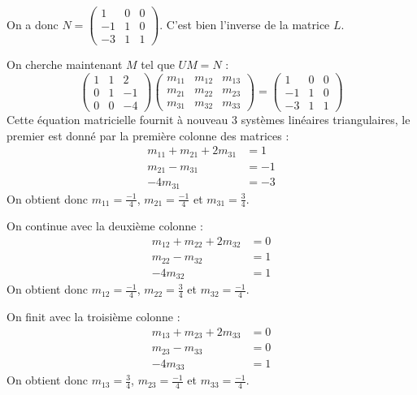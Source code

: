 \documentclass[10pt]{article}
\newenvironment{solution}
    {\par\vspace{0.5em}\begin{mdframed}[linewidth=0.5pt]\par}
    {\end{mdframed}\par\vspace{0.5em}}
\begin{document}
\begin{enumerate}
{\begin{solution}
            On a donc $N = \begin{pmatrix} 1 & 0 & 0 \\ -1 & 1 & 0 \\ -3 & 1 & 1 \end{pmatrix}$. C'est bien l'inverse de la matrice $L$. 

            On cherche maintenant $M$ tel que $U M = N$ : 
            \[
                \begin{pmatrix}
                    1 & 1 & 2 \\
                    0 & 1 & -1 \\
                    0 & 0 & -4
                \end{pmatrix}
                \begin{pmatrix}
                    m_{11} & m_{12} & m_{13} \\
                    m_{21} & m_{22} & m_{23} \\
                    m_{31} & m_{32} & m_{33}
                \end{pmatrix}
                = \begin{pmatrix} 1 & 0 & 0 \\ -1 & 1 & 0 \\ -3 & 1 & 1 \end{pmatrix}
            \]
            Cette équation matricielle fournit à nouveau 3 systèmes linéaires triangulaires, le premier est donné par la première colonne des matrices : 
            \begin{align*}
                m_{11} + m_{21} + 2m_{31} &= 1 \\
                m_{21} - m_{31} &= -1 \\
                -4 m_{31} &= -3
            \end{align*}
            On obtient donc $m_{11} = \frac{-1}{4}$, $m_{21} = \frac{-1}{4}$ et $m_{31} = \frac{3}{4}$.

            On continue avec la deuxième colonne :
            \begin{align*}
                m_{12} + m_{22} + 2m_{32} &= 0 \\
                m_{22} - m_{32} &= 1 \\
                -4 m_{32} &= 1
            \end{align*}
            On obtient donc $m_{12} = \frac{-1}{4}$, $m_{22} = \frac{3}{4}$ et $m_{32} = \frac{-1}{4}$.

            On finit avec la troisième colonne :
            \begin{align*}
                m_{13} + m_{23} + 2m_{33} &= 0 \\
                m_{23} - m_{33} &= 0 \\
                -4 m_{33} &= 1
            \end{align*}
            On obtient donc $m_{13} = \frac{3}{4}$, $m_{23} = \frac{-1}{4}$ et $m_{33} = \frac{-1}{4}$.


\end{solution}}
\end{enumerate}
\end{document}
